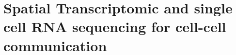 \cleartoevenpage
\pagestyle{empty}	

\chapter[Spatial transcriptomic and single cell RNA sequencing for cell-cell communication]{Spatial Transcriptomic and single cell RNA sequencing for cell-cell communication}
\label{Chap:2}	%
\pagestyle{headings}
